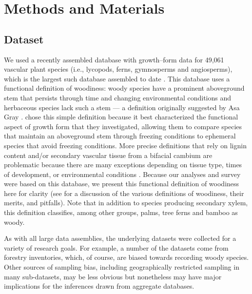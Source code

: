 \documentclass[a4paper,12pt]{article}
\begin{document}
\section{Methods and Materials}

\subsection{Dataset}

We used a recently assembled database with growth--form data for
49,061 vascular plant species (i.e., lycopods, ferns, gymnosperms and
angiosperms), which is the largest such database assembled to date
\citep[][available on the Dryad data repository; doi:10.5061/dryad.63q27/2]{Zanne}.
%
This database uses a functional definition of woodiness: woody species
have a prominent aboveground stem that persists through time and changing
environmental conditions and herbaceous species lack such a stem --- 
a definition originally suggested by Asa Gray \citeyearpar{gray1887elements}. 
\citet{Zanne}
chose this simple definition because it best characterized the functional
aspect of growth form that they investigated, allowing them to compare 
species that maintain an aboveground stem through freezing conditions to 
ephemeral species that avoid freezing conditions.  More precise definitions 
that rely on lignin content and/or secondary vascular tissue from a bifacial
cambium are problematic because there are many exceptions depending on tissue 
type, times of development, or environmental conditions 
\citep{Groover2005, Spicer2010, Rowe2012}.  
Because our analyses and survey were based on this database, 
we present this functional definition of woodiness here for clarity 
(see \citet{Zanne} for a discussion of the various definitions of woodiness, 
their merits, and pitfalls).  Note that in addition to species producing
secondary xylem, this definition
classifies, among other groups, palms, tree ferns and bamboo as
woody.
%
%

As with all large data assemblies, the underlying datasets were collected 
for a variety of research goals. For example, a number of the datasets come
from forestry inventories, which, of course, are biased towards recording
woody species. Other sources of sampling bias, including geographically restricted sampling 
in many sub-datasets, may be less obvious but
nonetheless may have major implications for the inferences drawn from 
aggregate databases.
\end{document}

